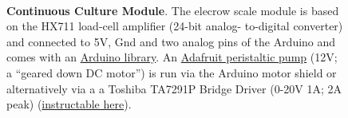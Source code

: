 \documentclass[12pt,a4paper]{scrartcl}
\begin{document}
\begin{figure}[ht]
  \begin{minipage}{.49\textwidth}
    \\
  \end{minipage}
  \begin{minipage}{.5\textwidth}
  \end{minipage}
\caption[]{\textbf{Continuous Culture Module}. The elecrow scale
  module is based on the HX711 load-cell amplifier (24-bit analog-
  to-digital converter) and connected to 5V, Gnd and two analog pins
  of the Arduino and comes with an
  \href{http://www.elecrow.com/wiki/index.php?title=Weight_Sensor_Scales_Kit-_20KG}{Arduino
    library}. An \href{https://www.adafruit.com/product/1150}{Adafruit
    peristaltic pump} (12V; a ``geared down DC motor'') is run via
  the Arduino motor shield or alternatively via a a Toshiba TA7291P
  Bridge Driver (0-20V 1A; 2A peak)
  (\href{http://www.instructables.com/id/Control-peristaltic-pump-with-TA7291P-and-an-Ardui/}{instructable
    here}). }
\end{figure}
\end{document}
